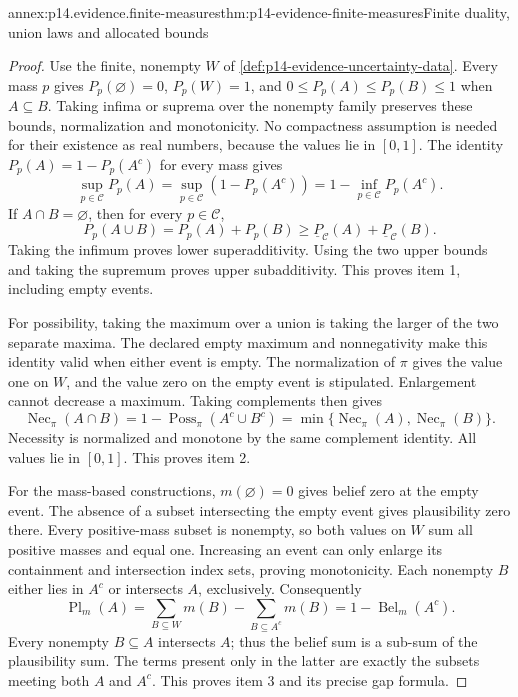 \begin{annexitem}{annex:p14.evidence.finite-measures}{thm:p14-evidence-finite-measures}{Finite duality, union laws and allocated bounds}
\begin{proof}
Use the finite, nonempty \(W\) of
\cref{def:p14-evidence-uncertainty-data}. Every mass \(p\) gives
\(P_p(\varnothing)=0\), \(P_p(W)=1\), and
\(0\leq P_p(A)\leq P_p(B)\leq1\) when \(A\subseteq B\).
Taking infima or suprema over the nonempty family preserves these bounds,
normalization and monotonicity. No compactness assumption is needed for
their existence as real numbers, because the values lie in \([0,1]\).
The identity \(P_p(A)=1-P_p(A^c)\) for every mass gives
\[
 \sup_{p\in\mathcal C}P_p(A)
 =\sup_{p\in\mathcal C}(1-P_p(A^c))
 =1-\inf_{p\in\mathcal C}P_p(A^c).
\]
If \(A\cap B=\varnothing\), then for every \(p\in\mathcal C\),
\[
 P_p(A\cup B)=P_p(A)+P_p(B)
 \geq\underline P_{\mathcal C}(A)+\underline P_{\mathcal C}(B).
\]
Taking the infimum proves lower superadditivity. Using the two upper
bounds and taking the supremum proves upper subadditivity. This proves
item 1, including empty events.

For possibility, taking the maximum over a union is taking the larger of
the two separate maxima. The declared empty maximum and nonnegativity make
this identity valid when either event is empty. The normalization of
\(\pi\) gives the value one on \(W\), and the value zero on the empty
event is stipulated. Enlargement cannot decrease a maximum. Taking
complements then gives
\[
 \operatorname{Nec}_{\pi}(A\cap B)
 =1-\operatorname{Poss}_{\pi}(A^c\cup B^c)
 =\min\{\operatorname{Nec}_{\pi}(A),\operatorname{Nec}_{\pi}(B)\}.
\]
Necessity is normalized and monotone by the same complement identity.
All values lie in \([0,1]\). This proves item 2.

For the mass-based constructions, \(m(\varnothing)=0\) gives belief zero
at the empty event. The absence of a subset intersecting the empty event
gives plausibility zero there. Every positive-mass subset is nonempty, so
both values on \(W\) sum all positive masses and equal one. Increasing an
event can only enlarge its containment and intersection index sets, proving
monotonicity. Each nonempty \(B\) either lies in \(A^c\) or intersects
\(A\), exclusively. Consequently
\[
 \operatorname{Pl}_m(A)=\sum_{B\subseteq W}m(B)
          -\sum_{B\subseteq A^c}m(B)=1-\operatorname{Bel}_m(A^c).
\]
Every nonempty \(B\subseteq A\) intersects \(A\); thus the belief sum
is a sub-sum of the plausibility sum. The terms present only in the latter
are exactly the subsets meeting both \(A\) and \(A^c\). This proves
item 3 and its precise gap formula.


\end{proof}
\end{annexitem}
